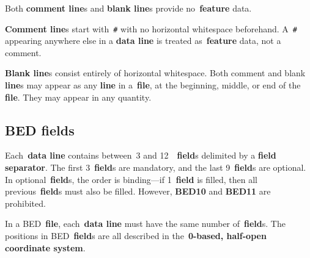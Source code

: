 \documentclass[11pt]{article}
\begin{document}
Both \textbf{comment line}s and \textbf{blank line}s provide no~\textbf{feature} data.

\textbf{Comment line}s start with~\texttt{\#} with no horizontal whitespace beforehand.
A~\texttt{\#} appearing anywhere else in a \textbf{data line} is treated as~\textbf{feature} data, not a comment.

\textbf{Blank line}s consist entirely of horizontal whitespace.
Both comment and blank \textbf{line}s may appear as any \textbf{line} in a~\textbf{file}, at the beginning, middle, or end of the \textbf{file}.
They may appear in any quantity.

\subsection{\acs{BED} fields}

Each~\textbf{data line} contains between~3 and 12~~\textbf{field}s delimited by a \textbf{field separator}.
The first 3~\textbf{field}s are mandatory, and the last 9~\textbf{field}s are optional.
In optional~\textbf{field}s, the order is binding---if 1~\textbf{field} is filled, then all previous~\textbf{field}s must also be filled.
However, \textbf{BED10} and \textbf{BED11} are prohibited.

In a \ac{BED}~\textbf{file}, each~\textbf{data line} must have the same number of~\textbf{field}s.
The positions in \ac{BED}~\textbf{field}s are all described in the~\textbf{0-based, half-open coordinate system}.
\end{document}
